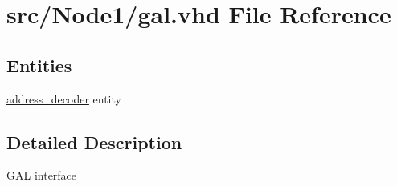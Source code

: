\hypertarget{gal_8vhd}{}\section{src/\+Node1/gal.vhd File Reference}
\label{gal_8vhd}
\subsection*{Entities}
\begin{DoxyCompactItemize}
\item 
\hyperlink{classaddress__decoder}{address\+\_\+decoder} entity
\end{DoxyCompactItemize}


\subsection{Detailed Description}

\begin{DoxyItemize}
\item G\+AL interface 
\end{DoxyItemize}